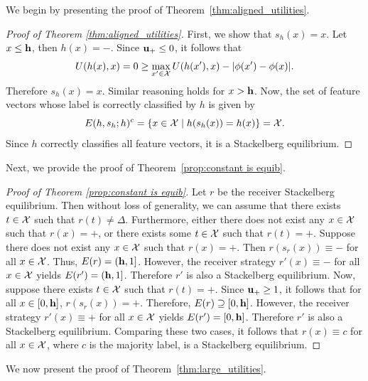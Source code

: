 We begin by presenting the proof of Theorem~\ref{thm:aligned_utilities}.

\begin{proof}[Proof of Theorem \ref{thm:aligned_utilities}]\label{proof:aligned_utilities}
	First, we show that $s_h(x) = x$. Let $x \leq \mathbf{h}$, then $h(x) = \minus$.
    Since $\mathbf{u_+} \leq 0$, it follows that
\[U(h(x),x) = 0 \geq \max_{x' \in \mathcal{X}}U(h(x'),x) - |\phi(x')-\phi(x)|.\]
Therefore $s_h(x) = x$. Similar reasoning holds for $x > \mathbf{h}$.
	Now, the set of feature vectors whose label is correctly classified by $h$ is given by
	$$E(h,s_h;h)^c = \{x \in \mathcal{X} \mid h(s_h(x)) = h(x)\} = \mathcal{X}.$$
	Since $h$ correctly classifies all feature vectors, it is a Stackelberg equilibrium.
\end{proof}

Next, we provide the proof of Theorem~\ref{prop:constant is equib}.

\begin{proof}[Proof of Theorem \ref{prop:constant is equib}]\label{proof:constant_is_equib}
Let $r$ be the receiver Stackelberg equilibrium. Then without loss of generality, we can assume that there exists $t \in \mathcal{X}$ such that $r(t) \neq \Delta$. Furthermore, either there does not exist any $x \in \mathcal{X}$ such that $r(x) = \plus$, or there exists some $t \in \mathcal{X}$ such that $r(t) = \plus$. Suppose there does not exist any $x \in \mathcal{X}$ such that $r(x) = \plus$. Then $r(s_r(x)) \equiv \minus$ for all $x \in \mathcal{X}$. Thus, $E(r) = (\mathbf{h},1]$. However, the receiver strategy $r'(x) \equiv \minus$ for all $x \in \mathcal{X}$ yields $E(r') = (\mathbf{h},1]$. Therefore $r'$ is also a Stackelberg equilibrium.
Now, suppose there exists $t \in \mathcal{X}$ such that $r(t) = \plus$. Since $\mathbf{u_+} \geq 1$, it follows that for all $x \in [0,\mathbf{h}]$, $r(s_r(x)) = \plus$. Therefore, $E(r) \supseteq [0,\mathbf{h}]$. However, the receiver strategy $r'(x) \equiv \plus$ for all $x \in \mathcal{X}$ yields $E(r') = [0,\mathbf{h}]$. Therefore $r'$ is also a Stackelberg equilibrium.
Comparing these two cases, it follows that $r(x) \equiv c$ for all $x \in \mathcal{X}$, where $c$ is the majority label, is a Stackelberg equilibrium.
\end{proof}

We now present the proof of Theorem~\ref{thm:large_utilities}.

